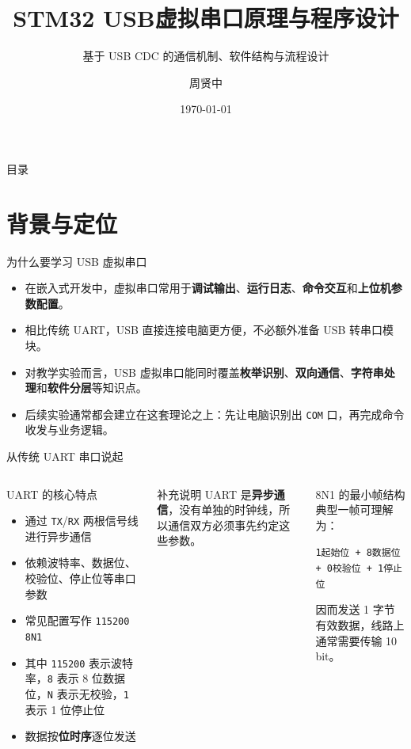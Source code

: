 \documentclass[11pt,aspectratio=169]{ctexbeamer}
\title{STM32 USB虚拟串口原理与程序设计}
\subtitle{基于 USB CDC 的通信机制、软件结构与流程设计}
\author{周贤中}
\institute{集成电路学院\\
\vspace{0.5cm}
广东工业大学}
\date{\today}
\newcommand{\code}[1]{\texttt{#1}}
\newcommand{\term}[1]{\textbf{\color{PrimaryBlue}#1}}
\begin{document}
\begin{frame}
  \titlepage
\end{frame}

\begin{frame}{目录}
  \tableofcontents
\end{frame}

\section{背景与定位}

\begin{frame}{为什么要学习 USB 虚拟串口}
  \begin{itemize}
    \item 在嵌入式开发中，虚拟串口常用于\term{调试输出}、\term{运行日志}、\term{命令交互}和\term{上位机参数配置}。
    \item 相比传统 UART，USB 直接连接电脑更方便，不必额外准备 USB 转串口模块。
    \item 对教学实验而言，USB 虚拟串口能同时覆盖\term{枚举识别}、\term{双向通信}、\term{字符串处理}和\term{软件分层}等知识点。
    \item 后续实验通常都会建立在这套理论之上：先让电脑识别出 \code{COM} 口，再完成命令收发与业务逻辑。
  \end{itemize}
\end{frame}

\begin{frame}{从传统 UART 串口说起}
  \small
  \begin{columns}[T,onlytextwidth]
    \begin{block}{UART 的核心特点}
      \begin{itemize}
        \item 通过 \code{TX}/\code{RX} 两根信号线进行异步通信
        \item 依赖波特率、数据位、校验位、停止位等串口参数
        \item 常见配置写作 \code{115200 8N1}
        \item 其中 \code{115200} 表示波特率，\code{8} 表示 8 位数据位，\code{N} 表示无校验，\code{1} 表示 1 位停止位
        \item 数据按\term{位时序}逐位发送
      \end{itemize}
    \end{block}

    \begin{alertblock}{补充说明}
      UART 是\term{异步通信}，没有单独的时钟线，所以通信双方必须事先约定这些参数。
    \end{alertblock}

    \begin{block}{8N1 的最小帧结构}
      典型一帧可理解为：
      \begin{center}
        \code{1起始位 + 8数据位 + 0校验位 + 1停止位}
      \end{center}
      因而发送 1 字节有效数据，线路上通常需要传输 10 bit。
    \end{block}
  \end{columns}
\end{frame}
\end{document}
